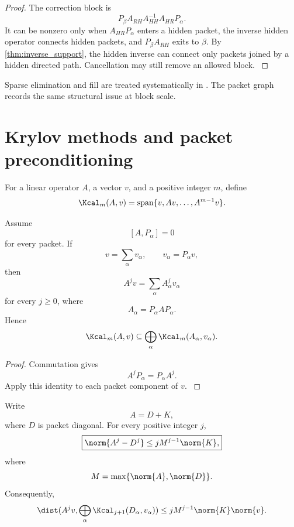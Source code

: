 \begin{proof}\label{main:proof:032}
The correction block is
\[
P_\beta A_{RH}A_{HH}^{-1}A_{HR}P_\alpha.
\]
It can be nonzero only when \(A_{HR}P_\alpha\) enters a hidden packet, the inverse hidden operator connects hidden packets, and \(P_\beta A_{RH}\) exits to \(\beta\). By \cref{thm:inverse_support}, the hidden inverse can connect only packets joined by a hidden directed path. Cancellation may still remove an allowed block.
\label{main:proof:032:end}\end{proof}

Sparse elimination and fill are treated systematically in \cite{Davis2006}. The packet graph records the same structural issue at block scale.

\section{Krylov methods and packet preconditioning}\label{main:section:007}\label{sec:krylov}

\begin{definition}\label{main:definition:010}\label{def:krylov}
For a linear operator \(A\), a vector \(v\), and a positive integer \(m\), define
\[
\Kcal_m(A,v)
=
\operatorname{span}
\{v,Av,\ldots,A^{m-1}v\}.
\]
\end{definition}

\begin{proposition}\label{main:proposition:007}\label{prop:krylov_invariant}
Assume
\[
[A,P_\alpha]=0
\]
for every packet. If
\[
v=\sum_\alpha v_\alpha,
\qquad
v_\alpha=P_\alpha v,
\]
then
\[
A^jv
=
\sum_\alpha A_\alpha^jv_\alpha
\]
for every \(j\geq0\), where
\[
A_\alpha=P_\alpha AP_\alpha.
\]
Hence
\[
\Kcal_m(A,v)
\subseteq
\bigoplus_\alpha
\Kcal_m(A_\alpha,v_\alpha).
\]
\end{proposition}

\begin{proof}\label{main:proof:033}
Commutation gives
\[
A^jP_\alpha=P_\alpha A^j.
\]
Apply this identity to each packet component of \(v\).
\label{main:proof:033:end}\end{proof}

\begin{theorem}\label{main:theorem:017}\label{thm:approx_krylov}
Write
\[
A=D+K,
\]
where \(D\) is packet diagonal. For every positive integer \(j\),
\[
\boxed{
\norm{A^j-D^j}
\leq
jM^{j-1}\norm{K},
}
\]
where
\[
M=\max\{\norm{A},\norm{D}\}.
\]
Consequently,
\[
\dist(A^jv,\bigoplus_\alpha\Kcal_{j+1}(D_\alpha,v_\alpha))
\leq
jM^{j-1}\norm{K}\norm{v}.
\]
\end{theorem}

